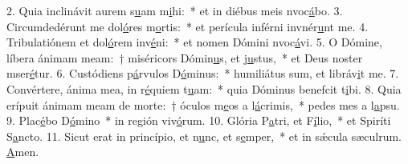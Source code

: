 2. Quia inclinávit aurem s\uline{u}am m\uline{i}hi:~* et in diébus meis nvoc\uline{á}bo.
3. Circumdedérunt me dol\uline{ó}res m\uline{o}rtis:~* et perícula inférni invnér\uline{u}nt me.
4. Tribulatiónem et dol\uline{ó}rem inv\uline{é}ni:~* et nomen Dómini nvoc\uline{á}vi.
5. O Dómine, líbera ánimam meam:~† miséricors Dómin\uline{u}s, et j\uline{u}stus,~* et Deus noster mser\uline{é}tur.
6. Custódiens p\uline{á}rvulos D\uline{ó}minus:~* humiliátus sum, et libráv\uline{i}t me.
7. Convértere, ánima mea, in r\uline{é}quiem t\uline{u}am:~* quia Dóminus benefcit t\uline{i}bi.
8. Quia erípuit ánimam meam de morte:~† óculos m\uline{e}os a l\uline{á}crimis,~* pedes mes a l\uline{a}psu.
9. Plac\uline{é}bo D\uline{ó}mino~* in región viv\uline{ó}rum.
10. Glória P\uline{a}tri, et F\uline{í}lio,~* et Spiríti S\uline{a}ncto.
11. Sicut erat in princípio, et n\uline{u}nc, et s\uline{e}mper,~* et in sǽcula sæculrum. \uline{A}men.
